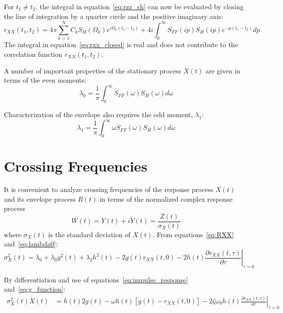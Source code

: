 \documentclass[12pt]{article}
\begin{document}
For $t_1 \neq t_2$, the integral in equation~\eqref{eq:rzz_sh} can now be evaluated by closing the line of integration by a quarter circle and the positive imaginary axis:
\begin{equation}
    r_{XX}(t_1, t_2) = 4\pi \sum_{k=1}^N C_k S_H(\Omega_k) e^{i\Omega_k (t_1 - t_2)} + 4i \int_0^{\infty} S_{FF}(ip) S_H(ip) e^{-p(t_1 - t_2)} dp
    \label{eq:rxx_closed}
\end{equation}
The integral in equation~\eqref{eq:rxx_closed} is real and does not contribute to the correlation function $r_{XX}(t_1, t_2)$.

A number of important properties of the stationary process $X(t)$ are given in terms of the even moments:
\begin{equation}
    \lambda_0 = \frac{1}{\pi} \int_0^{\infty} S_{FF}(\omega) S_H(\omega) d\omega
    \label{eq:lambda0}
\end{equation}

Characterization of the envelope also requires the odd moment, $\lambda_1$:
\begin{equation}
    \lambda_1 = \frac{1}{\pi} \int_0^{\infty} \omega S_{FF}(\omega) S_H(\omega) d\omega
    \label{eq:lambda1}
\end{equation}

\section{Crossing Frequencies}

It is convenient to analyze crossing frequencies of the response process $X(t)$ and its envelope process $R(t)$ in terms of the normalized complex response process
\begin{equation}
    W(t) = Y(t) + i \tilde{Y}(t) = \frac{Z(t)}{\sigma_X(t)}
    \label{eq:normalized_complex}
\end{equation}
where $\sigma_X(t)$ is the standard deviation of $X(t)$. From equations~\eqref{eq:RXX} and~\eqref{eq:lambda0}:
\begin{equation}
    \sigma_X^2(t) = \lambda_0 + \lambda_0 g^2(t) + \lambda_2 h^2(t) - 2g(t) r_{XX}(t, 0) - 2h(t) \left. \frac{\partial r_{XX}(t, \tau)}{\partial \tau} \right|_{\tau=0}
    \label{eq:sigmaX}
\end{equation}

By differentiation and use of equations~\eqref{eq:impulse_response} and~\eqref{eq:g_function}:
\begin{align}
    \sigma_X^2(t) \dot{X}(t) &= h(t) 2g(t) - \omega h(t) [\dot{g}(t) - r_{XX}(t, 0)] - 2\zeta\omega_0 h(t) \left. \frac{\partial r_{XX}(t, \tau)}{\partial \tau} \right|_{\tau=0}
    \label{eq:sigmaX_dot}
\end{align}
\end{document}
